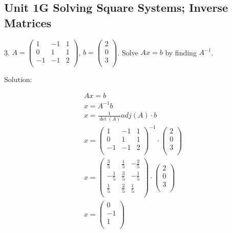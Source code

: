 \documentclass{article}
\begin{document}
\subsection*{Unit 1G Solving Square Systems; Inverse Matrices}

3. $A = \begin{pmatrix}
          1 & -1 & 1 \\
          0 & 1 & 1 \\
          -1 & -1 & 2 \\
        \end{pmatrix}$, $b = \begin{pmatrix}
                               2 \\
                               0 \\
                               3 \\ 
                             \end{pmatrix}$. Solve $Ax = b$ by finding $A^{-1}$.
                        
Solution:

\begin{gather*}
  Ax = b \\
  x = A^{-1}b \\
  x = \frac{1}{\det(A)}adj(A) \cdot b \\
  x = \begin{pmatrix}
        1 & -1 & 1 \\
        0 & 1 & 1 \\
        -1 & -1 & 2 \\ 
      \end{pmatrix}^{-1} \cdot
      \begin{pmatrix}
        2 \\
        0 \\
        3 \\
      \end{pmatrix} \\
  x = \begin{pmatrix}
        \frac{3}{5} & \frac{1}{5} & -\frac{2}{5} \\
        -\frac{1}{5} & \frac{3}{5} & -\frac{1}{5} \\
        \frac{1}{5} & \frac{2}{5} & \frac{1}{5} \\ 
      \end{pmatrix} \cdot
      \begin{pmatrix}
        2 \\
        0 \\
        3 \\
      \end{pmatrix} \\
  x = \begin{pmatrix}
        0 \\
        -1 \\
        1 \\ 
      \end{pmatrix}
\end{gather*}
\end{document}
